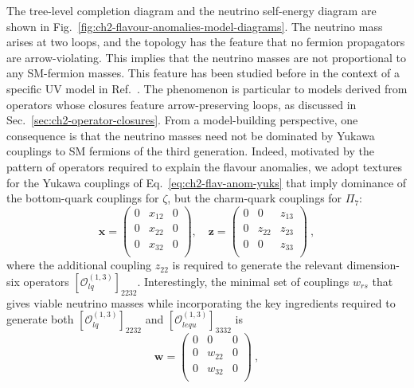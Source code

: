 The tree-level completion diagram and the neutrino self-energy diagram are shown
in Fig.~\ref{fig:ch2-flavour-anomalies-model-diagrams}. The neutrino mass arises at
two loops, and the topology has the feature that no fermion propagators are
arrow-violating. This implies that the neutrino masses are not proportional to
any SM-fermion masses. This feature has been studied before in the context of a
specific UV model in Ref.~\cite{Gargalionis:2019drk}. The phenomenon is
particular to models derived from operators whose closures feature
arrow-preserving loops, as discussed in Sec.~\ref{sec:ch2-operator-closures}. From a
model-building perspective, one consequence is that the neutrino masses need not
be dominated by Yukawa couplings to SM fermions of the third generation. Indeed,
motivated by the pattern of operators required to explain the flavour anomalies,
we adopt textures for the Yukawa couplings of Eq.~\eqref{eq:ch2-flav-anom-yuks} that
imply dominance of the bottom-quark couplings for $\zeta$, but the charm-quark
couplings for $\Pi_{7}$:
\begin{equation}
  \mathbf{x} = \begin{pmatrix}
    0 & x_{12} & 0 \\
    0 & x_{22} & 0 \\
    0 & x_{32} & 0 \\
  \end{pmatrix},\quad \mathbf{z} = \begin{pmatrix}
    0 & 0 & z_{13} \\
    0 & z_{22} & z_{23} \\
    0 & 0 & z_{33} \\
  \end{pmatrix} \ ,
\end{equation}
where the additional coupling $z_{22}$ is required to generate the relevant
dimension-six operators $[\mathcal{O}_{lq}^{(1,3)}]_{2232}$. Interestingly, the
minimal set of couplings $w_{rs}$ that gives viable neutrino masses while
incorporating the key ingredients required to generate both
$[\mathcal{O}_{lq}^{(1,3)}]_{2232}$ and $[\mathcal{O}_{lequ}^{(1,3)}]_{3332}$ is
\begin{equation}
  \mathbf{w} = \begin{pmatrix}
    0 & 0 & 0 \\
    0 & w_{22} & 0 \\
    0 & w_{32} & 0 \\
    \end{pmatrix} \ ,
  \end{equation}
